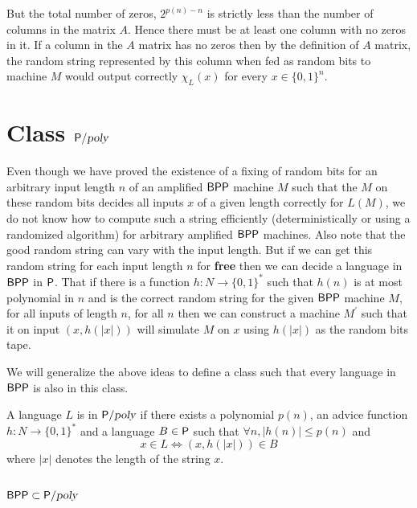 \documentclass[11pt]{article}
\begin{document}
But the total number of zeros, $2^{p(n)-n}$ is strictly less than the
number of columns in the matrix $A$. Hence there must be at least one
column with no zeros in it. If a column in the $A$ matrix has no zeros
then by the definition of $A$ matrix, the random string represented by
this column when fed as random bits to machine $M$ would output
correctly $\chi_L(x)$ for every $x\in \{0,1\}^{n}$.

\section{Class $\P/\poly$}

Even though we have proved the existence of a fixing of random bits
for an arbitrary input length $n$ of an amplified $\BPP$ machine $M$
such that the $M$ on these random bits decides all inputs $x$ of a
given length correctly for $L(M)$, we do not know how to compute such
a string efficiently (deterministically or using a randomized
algorithm) for arbitrary amplified $\BPP$ machines. Also note that the
good random string can vary with the input length. But if we can get
this random string for each input length $n$ for \textbf{free} then we
can decide a language in $\BPP$ in $\P$. That if there is a function
$h:N \to \{0,1\}^*$ such that $h(n)$ is at most polynomial in $n$ and
is the correct random string for the given $\BPP$ machine $M$, for all
inputs of length $n$, for all $n$ then we can construct a machine
$M^{'}$ such that it on input $(x,h(|x|))$ will simulate $M$ on $x$
using $h(|x|)$ as the random bits tape.

We will generalize the above ideas to define a class such that every
language in $\BPP$ is also in this class. 

\begin{definition}[$\P/\poly$]
A language $L$ is in $\P/\poly$ if there exists a polynomial $p(n)$, an
advice function $h:N\to \{0,1\}^*$ and a language $B\in \P$ such that
$\forall n,|h(n)|\leq p(n)$ and 
\begin{displaymath}
  x\in L  \iff (x,h(|x|)) \in B 
\end{displaymath}
where $|x|$ denotes the length of the string $x$.

\end{definition}

\subsection{$\BPP \subset \P/\poly$}
\end{document}
